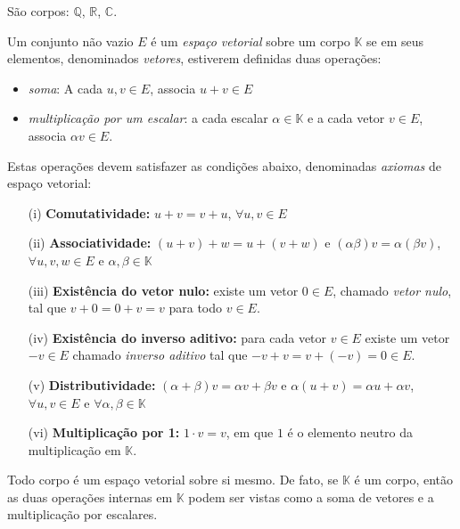 \begin{exemplo*}
  São corpos: ${\mathbb{Q}}$, ${\mathbb{R}}$, ${\mathbb{C}}$. 
\end{exemplo*}

\begin{defi}
  Um conjunto não vazio $E$ é um \emph{espaço vetorial} sobre um corpo ${\mathbb{K}}$ se em seus elementos, denominados \emph{vetores}, estiverem definidas duas operações: 
  \begin{itemize}
  \item \emph{soma}: A cada $u,v \in E$, associa $u+v \in E$
  \item \emph{multiplicação por um escalar}: a cada escalar $\alpha \in {\mathbb{K}}$ e a cada vetor $v \in E$, associa $\alpha v \in E$.
  \end{itemize}
  Estas operações devem satisfazer as condições abaixo, denominadas \emph{axiomas} de espaço vetorial:
  \begin{itemize}
  \item[(i)] {\bf{Comutatividade:}} $u+v = v+u$, $\forall u, v \in E$
  \item[(ii)] {\bf{Associatividade:}} $(u+v)+w = u+(v+w)$ e $(\alpha \beta)v = \alpha (\beta v)$, $\forall u, v, w\in E$ e $\alpha, \beta \in {\mathbb{K}}$
  \item[(iii)] {\bf{Existência do vetor nulo:}} existe um vetor $0\in E$, chamado \emph{vetor nulo}, tal que $v+0 = 0+v = v$ para todo $v\in E$.
  \item[(iv)] {\bf{Existência do inverso aditivo:}} para cada vetor $v\in E$ existe um vetor $-v \in E$ chamado \emph{inverso aditivo} tal que $-v+v = v+(-v) = 0\in E$.
  \item[(v)] {\bf{Distributividade:}} $(\alpha + \beta)v = \alpha v + \beta v$ e $\alpha(u+v) = \alpha u + \alpha v$, $\forall u, v \in E$ e $\forall \alpha, \beta \in {\mathbb{K}}$
  \item[(vi)] {\bf{Multiplicação por 1:}} $1\cdot v = v$, em que $1$ é o elemento neutro da multiplicação em ${\mathbb{K}}$.
  \end{itemize}
\end{defi}

\begin{exemplo}
  Todo corpo é um espaço vetorial sobre si mesmo. De fato, se ${\mathbb{K}}$ é um corpo, então as duas operações internas em ${\mathbb{K}}$ podem ser vistas como a soma de vetores e a multiplicação por escalares. 
\end{exemplo}

